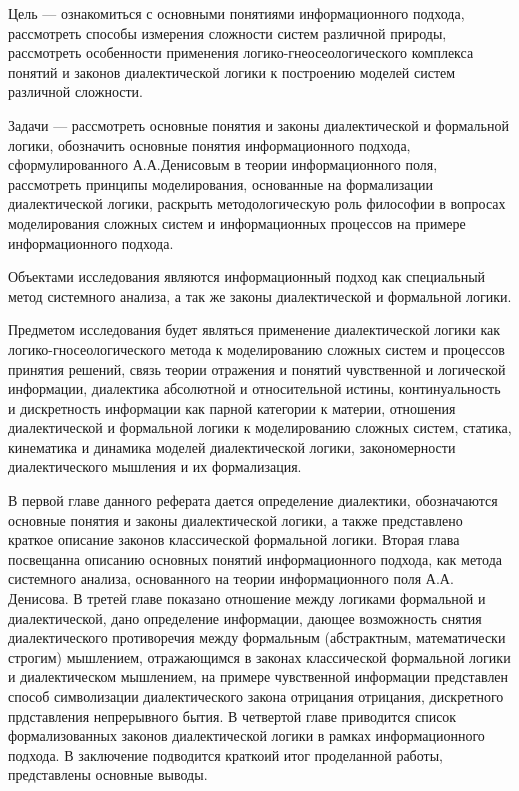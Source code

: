 \documentclass[a4paper,12pt]{report}
\begin{document}
	Цель — ознакомиться с основными понятиями информационного подхода, рассмотреть способы измерения сложности систем различной природы, рассмотреть особенности применения логико-гнеосеологического комплекса понятий и законов диалектической логики к построению моделей систем различной сложности.
	
	Задачи —  рассмотреть основные понятия и законы диалектической и формальной логики,  обозначить основные понятия информационного подхода, сформулированного А.А.Денисовым в теории информационного поля, рассмотреть принципы моделирования, основанные на формализации диалектической логики, раскрыть методологическую роль философии в  вопросах моделирования сложных систем и информационных процессов на примере информационного подхода. 
	
	Объектами исследования являются информационный подход как специальный метод системного анализа, а так же законы диалектической и формальной логики.
	
	Предметом исследования будет являться применение диалектической логики как логико-гносеологического метода к моделированию сложных систем и процессов принятия решений, связь теории отражения и понятий чувственной и логической информации, диалектика абсолютной и относительной истины, континуальность и дискретность информации как парной категории к материи,  отношения диалектической и формальной логики к моделированию сложных систем, статика, кинематика и динамика моделей диалектической логики, закономерности диалектического мышления и их формализация.
	
	В первой главе данного реферата дается  определение диалектики, обозначаются основные понятия и законы диалектической логики, а также представлено краткое описание законов классической формальной логики.  Вторая глава посвещанна описанию основных понятий информационного подхода, как метода системного анализа, основанного на теории информационного поля А.А. Денисова. В третей главе показано отношение между логиками формальной и диалектической, дано определение информации, дающее возможность снятия диалектического  противоречия между формальным (абстрактным, математически строгим) мышлением, отражающимся в законах классической формальной логики и диалектическом мышлением, на примере чувственной информации представлен способ символизации диалектического закона отрицания отрицания, дискретного прдставления непрерывного бытия. В четвертой главе приводится список формализованных законов диалектической логики в рамках информационного подхода. В заключение подводится краткоий итог проделанной работы, представлены основные выводы.  
\end{document}
